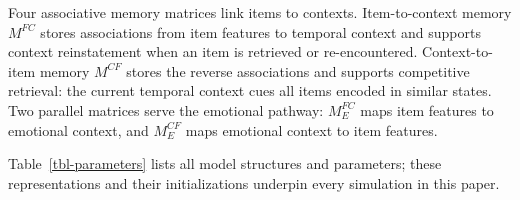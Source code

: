 \documentclass[
  man,
  floatsintext,
  longtable,
  nolmodern,
  notxfonts,
  notimes,
  draftfirst,
  colorlinks=true,linkcolor=blue,citecolor=blue,urlcolor=blue]{apa7}
\begin{document}
Four associative memory matrices link items to contexts. Item-to-context
memory \(M^{FC}\) stores associations from item features to temporal
context and supports context reinstatement when an item is retrieved or
re-encountered. Context-to-item memory \(M^{CF}\) stores the reverse
associations and supports competitive retrieval: the current temporal
context cues all items encoded in similar states. Two parallel matrices
serve the emotional pathway: \(M^{FC}_E\) maps item features to
emotional context, and \(M^{CF}_E\) maps emotional context to item
features.

Table~\ref{tbl-parameters} lists all model structures and parameters;
these representations and their initializations underpin every
simulation in this paper.

\begin{table}

{\caption{{Model structures and parameters. Base parameters
(\(\beta_{enc}\) through \(\theta_r\), excluding \(\beta_{emot}\) and
\(\omega_E\)) are fitted per-subject to the free-recall benchmark of
Healey and Kahana
().}{\label{tbl-parameters}}}
\vspace{-20pt}}


\end{table}
\end{document}
